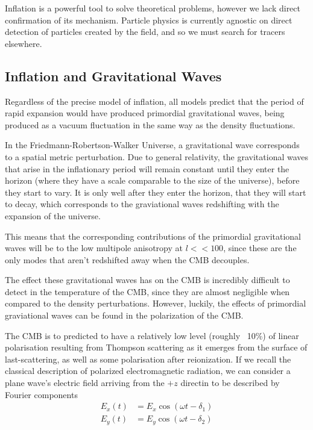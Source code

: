 Inflation is a powerful tool to solve theoretical problems, however we lack direct confirmation of its mechanism. Particle physics is currently agnostic on direct detection of particles created by the field, and so we must search for tracers elsewhere.

\subsection{Inflation and Gravitational Waves}
Regardless of the precise model of inflation, all models predict that the period of rapid expansion would have produced primordial gravitational waves, being produced as a vacuum fluctuation in the same way as the density fluctuations.

\par In the Friedmann-Robertson-Walker Universe, a gravitational wave corresponds to a spatial metric perturbation. Due to general relativity, the gravitational waves that arise in the inflationary period will remain constant until they enter the horizon (where they have a scale comparable to the size of the universe), before they start to vary. It is only well after they enter the horizon, that they will start to decay, which corresponds to the graviational waves redshifting with the expansion of the universe.

\par This means that the corresponding contributions of the primordial gravitational waves will be to the low multipole anisotropy at $l<<100$, since these are the only modes that aren't redshifted away when the CMB decouples.

\par The effect these gravitational waves has on the CMB is incredibly difficult to detect in the temperature of the CMB, since they are almost negligible when compared to the density perturbations. However, luckily, the effects of primordial graviational waves can be found in the polarization of the CMB.

\par The CMB is to predicted to have a relatively low level (roughly ~10\%) of linear polarisation resulting from Thompson scattering as it emerges from the surface of last-scattering, as well as some polarisation after reionization. If we recall the classical description of polarized electromagnetic radiation, we can consider a plane wave's electric field arriving from the $+z$ directin to be described by Fourier components
\begin{align*}
	E_x (t) & = E_x \cos(\omega t - \delta_1) \\
	E_y (t) & = E_y \cos(\omega t - \delta_2) 
\end{align*}

